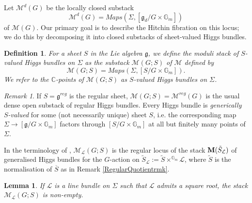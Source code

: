 \documentclass{amsart}
\newtheorem{lemma}[theorem]{Lemma}
\newtheorem{definition}[theorem]{Definition}
\theoremstyle{remark}
\newtheorem{remark}[theorem]{Remark}
\numberwithin{theorem}{section}
\numberwithin{equation}{section}
\begin{document}
Let $\mathcal M^{d}(G)$ be the locally closed substack
\begin{equation}\label{CentHiggsOpeneqn}
   \mathcal M^{d}(G) = Maps(\Sigma, [\mathfrak{g}_d/G \times \mathbb{G}_m]) 
\end{equation}
of $\mathcal M(G)$. Our primary goal is to describe the Hitchin fibration on this locus; we do this by decomposing it into closed substacks of sheet-valued Higgs bundles.

\begin{definition}\label{SheetHiggsdef}
    For a sheet $S$ in the Lie algebra $\mathfrak{g}$, we define the \emph{moduli stack of $S$-valued Higgs bundles on $\Sigma$} as the substack $\mathcal M(G;S)$ of $\mathcal M$ defined by
    \begin{equation}\label{Sheetiggseqn}
        \mathcal M(G;S) = Maps(\Sigma,[S/G\times\mathbb{G}_m]).
    \end{equation}
    We refer to the $\mathbb{C}$-points of $\mathcal M(G;S)$ as \emph{$S$-valued Higgs bundles on $\Sigma$}.
\end{definition}

\begin{remark}\label{SheetHiggsrmk}
   If $S = \mathfrak{g}^{reg}$ is the regular sheet, $\mathcal M(G;S) = \mathcal M^{reg}(G)$ is the usual dense open substack of regular Higgs bundles. Every Higgs bundle is \emph{generically $S$-valued} for some (not necessarily unique) sheet $S$, i.e. the corresponding map $\Sigma \rightarrow [\mathfrak{g}/G \times \mathbb{G}_m]$ factors through $[S/G \times \mathbb{G}_m]$ at all but finitely many points of $\Sigma$.

   In the terminology of \cite[Section 4.3]{Ngo3}, $\mathcal M_\mathcal L(G;S)$ is the regular locus of the stack ${\bf M}(\tilde{S}_\mathcal L)$ of generalised Higgs bundles for the $G$-action on $\tilde{S}_\mathcal L := \tilde{S} \times^{\mathbb{G}_m} \mathcal L$, where $\tilde{S}$ is the normalisation of $\overline{S}$ as in Remark \ref{RegularQuotientrmk}.
\end{remark}

\begin{lemma}\label{SheetHiggsNonElem}
   If $\mathcal L$ is a line bundle on $\Sigma$ such that $\mathcal L$ admits a square root, the stack $\mathcal M_{\mathcal L}(G;S)$ is non-empty.
\end{lemma}
\end{document}
